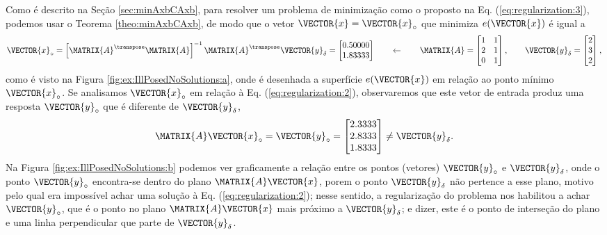 \begin{SolutionT}
Como é descrito na Seção \ref{sec:minAxbCAxb}, para resolver um problema de minimização como o proposto na Eq. (\ref{eq:regularization:3}),
podemos usar o Teorema \ref{theo:minAxbCAxb}, de modo que o vetor $\VECTOR{x}=\VECTOR{x}_{\circ}$ que minimiza $e(\VECTOR{x})$
é igual a
\begin{equation}\label{eq:regularization:3b}
\VECTOR{x}_{\circ} =
\left[ \MATRIX{A}^{\transpose} \MATRIX{A} \right]^{-1}\MATRIX{A}^{\transpose}\VECTOR{y}_{\delta}
=
\begin{bmatrix}
0.50000 \\
1.83333
\end{bmatrix}
\qquad \leftarrow \qquad
\MATRIX{A}=
\begin{bmatrix}
1 & 1\\
2 & 1\\
0 & 1
\end{bmatrix},
\qquad
\VECTOR{y}_{\delta}=
\begin{bmatrix}
2\\
3\\
2
\end{bmatrix},
\end{equation}
como é visto na Figura \ref{fig:ex:IllPosedNoSolutions:a}, 
onde é desenhada a superfície $e(\VECTOR{x})$ em relação ao ponto mínimo $\VECTOR{x}_{\circ}$.
Se analisamos $\VECTOR{x}_{\circ}$ em relação à Eq. (\ref{eq:regularization:2}),
observaremos que este vetor de entrada produz uma resposta $\VECTOR{y}_{\circ}$ que é diferente de $\VECTOR{y}_{\delta}$,
\begin{equation}
\MATRIX{A}\VECTOR{x}_{\circ}= \VECTOR{y}_{\circ} =
\begin{bmatrix}
2.3333\\
2.8333\\
1.8333
\end{bmatrix}
\neq \VECTOR{y}_{\delta}.
\end{equation}
Na Figura \ref{fig:ex:IllPosedNoSolutions:b} podemos ver graficamente a relação entre os pontos (vetores)
$\VECTOR{y}_{\circ}$ e $\VECTOR{y}_{\delta}$,
onde o ponto $\VECTOR{y}_{\circ}$ encontra-se dentro do plano $\MATRIX{A}\VECTOR{x}$,
porem o ponto $\VECTOR{y}_{\delta}$ não pertence a esse plano, 
motivo pelo qual era impossível achar uma solução à Eq. (\ref{eq:regularization:2});
nesse sentido, a regularização do problema nos habilitou a achar $\VECTOR{y}_{\circ}$,
que é o ponto no plano  $\MATRIX{A}\VECTOR{x}$ mais próximo a $\VECTOR{y}_{\delta}$;
e dizer, este é o ponto de interseção do plano e uma linha perpendicular que parte de $\VECTOR{y}_{\delta}$.
\end{SolutionT}


